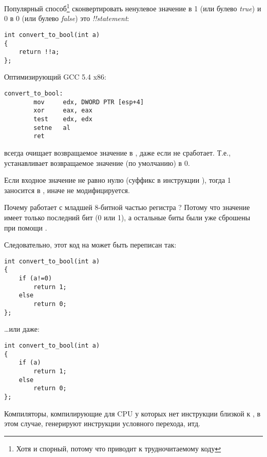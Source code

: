 
Популярный способ\footnote{Хотя и спорный, потому что приводит к трудночитаемому коду} сконвертировать ненулевое значение
в 1 (или булево \emph{true}) и 0 в 0 (или булево \emph{false}) это \emph{!!statement}:

\begin{lstlisting}[style=customc]
int convert_to_bool(int a)
{
	return !!a;
};
\end{lstlisting}

Оптимизирующий GCC 5.4 x86:

\begin{lstlisting}[style=customasmx86]
convert_to_bool:
        mov     edx, DWORD PTR [esp+4]
        xor     eax, eax
        test    edx, edx
        setne   al
        ret
\end{lstlisting}

 всегда очищает возвращаемое значение в \EAX, даже если  не сработает.
Т.е.,  устанавливает возвращаемое значение (по умолчанию) в 0.

Если входное значение не равно нулю (суффикс  в инструкции ),
тогда 1 заносится в \AL, иначе \AL не модифицируется.

Почему  работает с младшей 8-битной частью регистра \EAX{}?
Потому что значение имеет только последний бит (0 или 1), а остальные биты были уже сброшены при помощи .

Следовательно, этот код на \CCpp может быть переписан так:

\begin{lstlisting}[style=customc]
int convert_to_bool(int a)
{
	if (a!=0)
		return 1;
	else
		return 0;
};
\end{lstlisting}

\dots или даже:

\begin{lstlisting}[style=customc]
int convert_to_bool(int a)
{
	if (a)
		return 1;
	else
		return 0;
};
\end{lstlisting}

Компиляторы, компилирующие для \ac{CPU} у которых нет инструкции близкой к
, в этом случае, генерируют инструкции условного перехода, итд.

